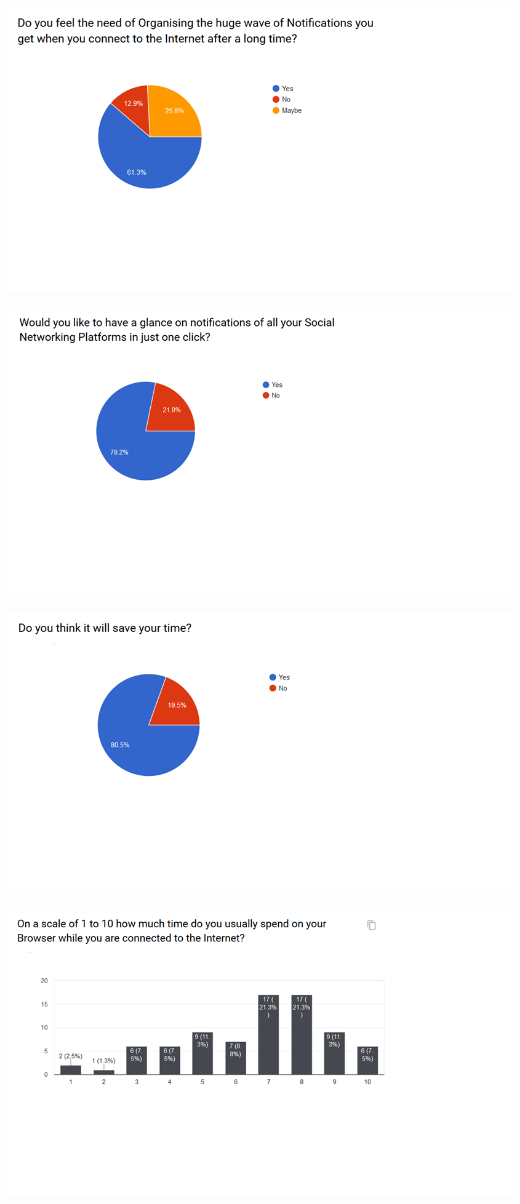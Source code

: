 \documentclass[12pt]{article}
\begin{document}
  \includegraphics[width=\linewidth]{srs4.png}
  
  \includegraphics[width=\linewidth]{srs5.png}
  
  \includegraphics[width=\linewidth]{srs6.png}
  
  \includegraphics[width=\linewidth]{srs7.png}
  
\end{document}
